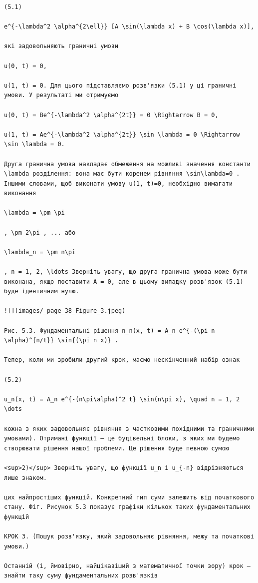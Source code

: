 \documentclass[
  ukrainian,
]{article}
\begin{document}
\begin{verbatim}
(5.1)

e^{-\lambda^2 \alpha^{2\ell}} [A \sin(\lambda x) + B \cos(\lambda x)],

які задовольняють граничні умови

u(0, t) = 0,

u(1, t) = 0. Для цього підставляємо розв'язки (5.1) у ці граничні умови. У результаті ми отримуємо

u(0, t) = Be^{-\lambda^2 \alpha^{2t}} = 0 \Rightarrow B = 0,

u(1, t) = Ae^{-\lambda^2 \alpha^{2t}} \sin \lambda = 0 \Rightarrow \sin \lambda = 0.

Друга гранична умова накладає обмеження на можливі значення константи \lambda розділення: вона має бути коренем рівняння \sin\lambda=0 . Іншими словами, щоб виконати умову u(1, t)=0, необхідно вимагати виконання

\lambda = \pm \pi

, \pm 2\pi , ... або

\lambda_n = \pm n\pi

, n = 1, 2, \ldots Зверніть увагу, що друга гранична умова може бути виконана, якщо поставити A = 0, але в цьому випадку розв'язок (5.1) буде ідентичним нулю.

![](images/_page_38_Figure_3.jpeg)

Рис. 5.3. Фундаментальні рішення n_n(x, t) = A_n e^{-(\pi n \alpha)^{n/t}} \sin{(\pi n x)} .

Тепер, коли ми зробили другий крок, маємо нескінченний набір ознак

(5.2)

u_n(x, t) = A_n e^{-(n\pi\alpha)^2 t} \sin(n\pi x), \quad n = 1, 2 \dots

кожна з яких задовольняє рівняння з частковими похідними та граничними умовами). Отримані функції — це будівельні блоки, з яких ми будемо створювати рішення нашої проблеми. Це рішення буде певною сумою

<sup>2)</sup> Зверніть увагу, що функції u_n і u_{-n} відрізняються лише знаком.

цих найпростіших функцій. Конкретний тип суми залежить від початкового стану. Фіг. Рисунок 5.3 показує графіки кількох таких фундаментальних функцій

КРОК 3. (Пошук розв'язку, який задовольняє рівняння, межу та початкові умови.)

Останній (і, ймовірно, найцікавіший з математичної точки зору) крок — знайти таку суму фундаментальних розв'язків


\end{verbatim}
\end{document}
